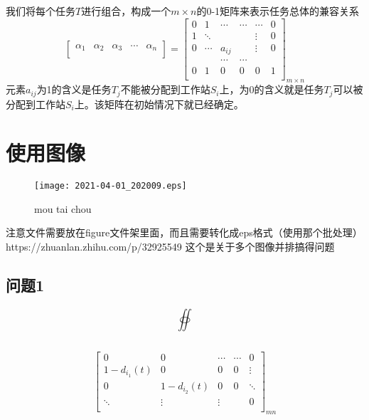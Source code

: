 \documentclass{MathorCupmodeling}
\begin{document}
我们将每个任务$T$进行组合，构成一个$m\times n$的0-1矩阵来表示任务总体的兼容关系
\begin{equation}
{\begin{bmatrix}\alpha_1&\alpha_2&\alpha_3&\cdots&\alpha_n\\\end{bmatrix}}={\begin{bmatrix}0&1&\cdots&\cdots&\cdots&0\\1&\ddots&&&\vdots&0\\0&\cdots&a_{ij}&&\vdots&0\\&&\cdots&\cdots&&\\0&1&0&0&0&1\\\end{bmatrix}}_{m\times n}
\end{equation}
元素$a_{ij}$为1的含义是任务$T_j$不能被分配到工作站$S_i$上，为0的含义就是任务$T_j$可以被分配到工作站$S_i$上。该矩阵在初始情况下就已经确定。


















\section{使用图像}
\begin{figure}[h]%
	\centering
	\texttt{[image: 2021-04-01\_202009.eps]} %
	\centering
  	\caption{mou tai chou}%

\end{figure}
注意文件需要放在figure文件架里面，而且需要转化成eps格式（使用那个批处理）
https://zhuanlan.zhihu.com/p/32925549 这个是关于多个图像并排搞得问题
	\subsection{问题1}
\begin{equation}
\oiint  \label{XX}
\end{equation}

\begin{equation}
		 \label{yy}
\end{equation}

\begin{equation}
{\begin{bmatrix} 0 & 0 &\cdots & \cdots & 0\\ 1-d_{i_1}(t) & 0 & 0 &0 & \vdots\\0&1-d_{i_2}(t)&0&0&\ddots \\\ddots&\vdots&\vdots& &0\\\end{bmatrix}}_{m n}
\end{equation}
\end{document}
